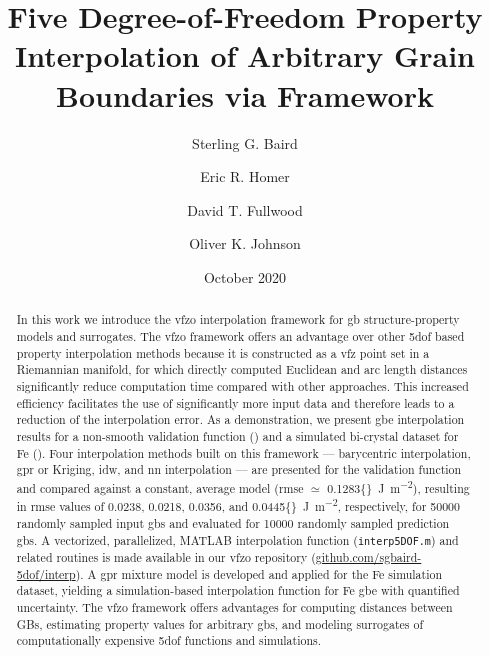 \documentclass[final,twocolumn,12pt]{elsarticle}
\newcommand{\inpt}{input}
\newcommand{\outpt}{prediction}
\newcommand{\vfzorepo}{\gls{vfzo} repository}
\newcommand{\baryrmse}{0.0238}
\newcommand{\gprrmse}{0.0218}
\newcommand{\idwrmse}{0.0356}
\newcommand{\nnrmse}{0.0445}
\newcommand{\avgrmse}{0.1283}
\begin{document}
\begin{frontmatter}

\title{Five Degree-of-Freedom Property Interpolation of Arbitrary Grain Boundaries via  Framework}

\author[myu]{Sterling G. Baird}
\author[myu]{Eric R. Homer}
\author[myu]{David T. Fullwood}
\author[myu]{Oliver K. Johnson}

\address[myu]{Department of Mechanical Engineering, Brigham Young University, Provo, UT 84602, USA}


\date{October 2020}

\begin{abstract}
    In this work we introduce the \gls{vfzo} interpolation framework for \gls{gb} structure-property models and surrogates. The \gls{vfzo} framework offers an advantage over other \gls{5dof} based property interpolation methods because it is constructed as a \gls{vfz} point set in a Riemannian manifold, for which directly computed Euclidean and arc length distances significantly reduce computation time compared with other approaches. This increased efficiency facilitates the use of significantly more input data and therefore leads to a reduction of the interpolation error. As a demonstration, we present \gls{gbe} interpolation results for a non-smooth validation function (\citet{bulatovGrainBoundaryEnergy2014}) and a simulated bi-crystal dataset for Fe (\citet{kimPhasefieldModeling3D2014}).
    Four interpolation methods built on this framework --- barycentric interpolation, \gls{gpr} or Kriging, \gls{idw}, and \gls{nn} interpolation --- are presented for the validation function and compared against a constant, average model (\gls{rmse} $\simeq$ \SI{\avgrmse{}}{\J\per\square\meter}), resulting in \gls{rmse} values of \baryrmse{}, \gprrmse{}, \idwrmse{}, and \SI{\nnrmse{}}{\J\per\square\meter},
    respectively, for \num{50000} randomly sampled \inpt{} \glspl{gb} and evaluated for \num{10000} randomly sampled \outpt{} \glspl{gb}. A vectorized, parallelized, MATLAB interpolation function (\texttt{interp5DOF.m}) and related routines is made available in our \vfzorepo{} (\url{github.com/sgbaird-5dof/interp}). A \gls{gpr} mixture model is developed and applied for the Fe simulation dataset, yielding a simulation-based interpolation function for Fe \gls{gbe} with quantified uncertainty. The \gls{vfzo} framework offers advantages for computing distances between GBs, estimating property values for arbitrary \glspl{gb}, and modeling surrogates of computationally expensive \gls{5dof} functions and simulations.
\end{abstract}


\end{frontmatter}
\end{document}
